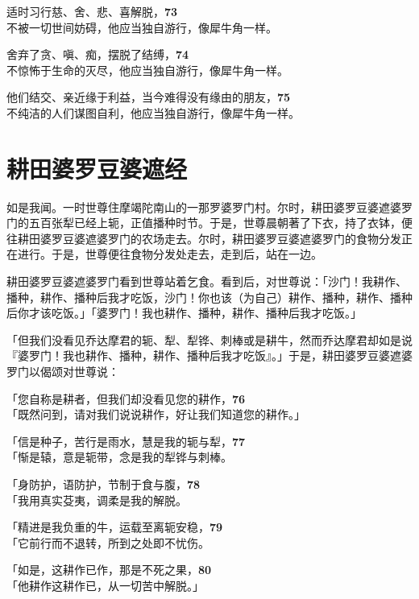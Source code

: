 适时习行慈、舍、悲、喜解脱，\hfill{\grayfootnotesize \textbf{73}} \\
不被一切世间妨碍，他应当独自游行，像犀牛角一样。


舍弃了贪、嗔、痴，摆脱了结缚，\hfill{\grayfootnotesize \textbf{74}} \\
不惊怖于生命的灭尽，他应当独自游行，像犀牛角一样。


他们结交、亲近缘于利益，当今难得没有缘由的朋友，\hfill{\grayfootnotesize \textbf{75}} \\
不纯洁的人们谋图自利，他应当独自游行，像犀牛角一样。


\section{耕田婆罗豆婆遮经}

如是我闻。一时世尊住摩竭陀南山的一那罗婆罗门村。尔时，耕田婆罗豆婆遮婆罗门的五百张犁已经上轭，正值播种时节。于是，世尊晨朝著了下衣，持了衣钵，便往耕田婆罗豆婆遮婆罗门的农场走去。尔时，耕田婆罗豆婆遮婆罗门的食物分发正在进行。于是，世尊便往食物分发处走去，走到后，站在一边。


耕田婆罗豆婆遮婆罗门看到世尊站着乞食。看到后，对世尊说：「沙门！我耕作、播种，耕作、播种后我才吃饭，沙门！你也该（为自己）耕作、播种，耕作、播种后你才该吃饭。」「婆罗门！我也耕作、播种，耕作、播种后我才吃饭。」


「但我们没看见乔达摩君的轭、犁、犁铧、刺棒或是耕牛，然而乔达摩君却如是说『婆罗门！我也耕作、播种，耕作、播种后我才吃饭』。」于是，耕田婆罗豆婆遮婆罗门以偈颂对世尊说：


「您自称是耕者，但我们却没看见您的耕作，\hfill{\grayfootnotesize \textbf{76}} \\
「既然问到，请对我们说说耕作，好让我们知道您的耕作。」

「信是种子，苦行是雨水，慧是我的轭与犁，\hfill{\grayfootnotesize \textbf{77}} \\
「惭是辕，意是轭带，念是我的犁铧与刺棒。


「身防护，语防护，节制于食与腹，\hfill{\grayfootnotesize \textbf{78}} \\
「我用真实芟夷，调柔是我的解脱。


「精进是我负重的牛，运载至离轭安稳，\hfill{\grayfootnotesize \textbf{79}} \\
「它前行而不退转，所到之处即不忧伤。


「如是，这耕作已作，那是不死之果，\hfill{\grayfootnotesize \textbf{80}} \\
「他耕作这耕作已，从一切苦中解脱。」


